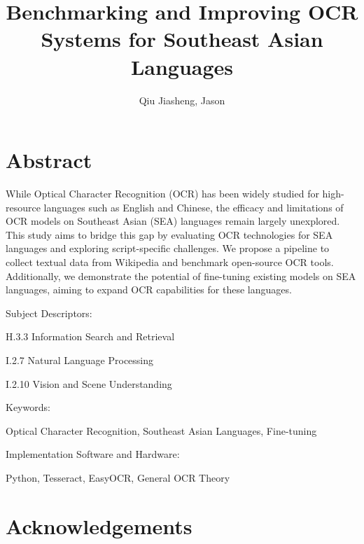 \documentclass[12pt,oneside]{memoir}
\title{Benchmarking and Improving OCR Systems for Southeast Asian Languages}
\author{Qiu Jiasheng, Jason}
\begin{document}
\frontmatter

\pagestyle{plain}

\makecover

\setcounter{page}{1}

\maketitle
{}

\chapter*{\centering\large Abstract}

While Optical Character Recognition (OCR) has been widely studied for high-resource languages such as English and Chinese, the efficacy and limitations of OCR models on Southeast Asian (SEA) languages remain largely unexplored. This study aims to bridge this gap by evaluating OCR technologies for SEA languages and exploring script-specific challenges. We propose a pipeline to collect textual data from Wikipedia and benchmark open-source OCR tools. Additionally, we demonstrate the potential of fine-tuning existing models on SEA languages, aiming to expand OCR capabilities for these languages.

\vspace{20pt}
Subject Descriptors:

\hspace*{0.3in} H.3.3 Information Search and Retrieval

\hspace*{0.3in} I.2.7 Natural Language Processing

\hspace*{0.3in} I.2.10 Vision and Scene Understanding

Keywords:

\hspace*{0.3in} Optical Character Recognition, Southeast Asian Languages, Fine-tuning

Implementation Software and Hardware:

\hspace*{0.3in} Python, Tesseract, EasyOCR, General OCR Theory

\chapter*{\centering\large Acknowledgements}
\end{document}
